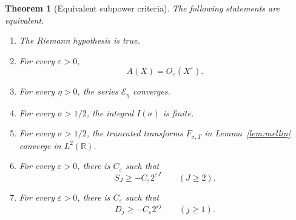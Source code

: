 \documentclass[11pt,a4paper]{amsart}
\newtheorem{theorem}{Theorem}[section]
\theoremstyle{definition}
\theoremstyle{remark}
\newcommand{\R}{\mathbb R}
\begin{document}
\begin{theorem}[Equivalent subpower criteria]\label{thm:equivalence}
The following statements are equivalent.
\begin{enumerate}
 \item The Riemann hypothesis is true.
 \item For every $\varepsilon>0$,
 \begin{equation}\label{eq:PE}
  A(X)=O_\varepsilon(X^\varepsilon).
 \end{equation}
 \item For every $\eta>0$, the series $\mathcal E_\eta$ converges.
 \item For every $\sigma>1/2$, the integral $I(\sigma)$ is finite.
 \item For every $\sigma>1/2$, the truncated transforms
 $F_{\sigma,T}$ in Lemma~\ref{lem:mellin} converge in $L^2(\R)$.
 \item For every $\varepsilon>0$, there is $C_\varepsilon$ such that
 \begin{equation}\label{eq:CDD}
  S_J\geq-C_\varepsilon 2^{\varepsilon J}
  \qquad(J\geq2).
 \end{equation}
 \item For every $\varepsilon>0$, there is $C_\varepsilon$ such that
 \begin{equation}\label{eq:IDD}
  D_j\geq-C_\varepsilon 2^{\varepsilon j}
  \qquad(j\geq1).
 \end{equation}
\end{enumerate}
\end{theorem}
\end{document}
